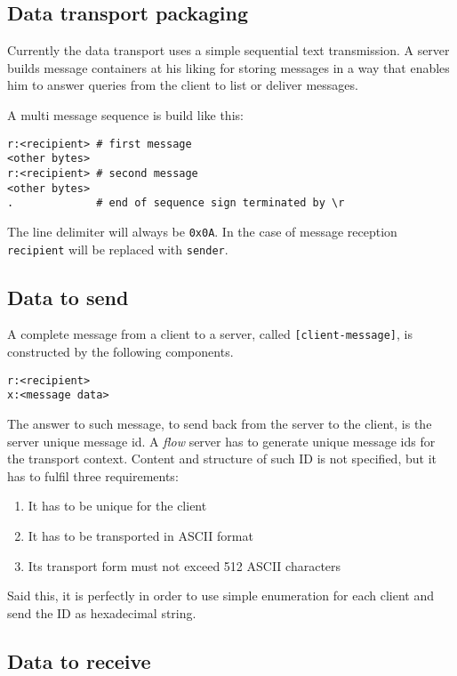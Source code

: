 \documentclass[twoside,a4paper,english,12pt,authoryear,openright]{book}
\newcommand{\flow}{\textit{flow} }
\begin{document}
\subsection{Data transport packaging}

Currently the data transport uses a simple sequential text transmission. A server builds message containers at his liking for storing messages in a way that enables him to answer queries from the client to list or deliver messages.

A multi message sequence is build like this:

\begin{lstlisting}
r:<recipient> # first message
<other bytes>
r:<recipient> # second message
<other bytes>
.             # end of sequence sign terminated by \r
\end{lstlisting}

The line delimiter will always be \texttt{0x0A}. In the case of message reception \texttt{recipient} will be replaced with \texttt{sender}.


\subsection{Data to send}

A complete message from a client to a server, called \texttt{[client-message]}, is constructed by the following components.

\begin{lstlisting}
r:<recipient>
x:<message data>
\end{lstlisting}

The answer to such message, to send back from the server to the client, is the server unique message id. A \flow server has to generate unique message ids for the transport context. Content and structure of such ID is not specified, but it has to fulfil three requirements:

\begin{enumerate}
\item{It has to be unique for the client}
\item{It has to be transported in ASCII format}
\item{Its transport form must not exceed 512 ASCII characters}
\end{enumerate}

Said this, it is perfectly in order to use simple enumeration for each client and send the ID as hexadecimal string.


\subsection{Data to receive}
\end{document}

